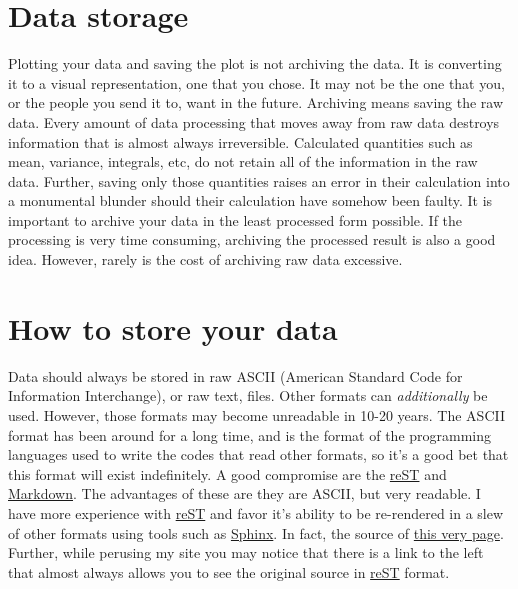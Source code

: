 \documentclass[a4paper]{article}
\begin{document}
\section{Data storage%
  \label{data-storage}%
}

Plotting your data and saving the plot is not archiving the data. It is
converting it to a visual representation, one that you chose. It may not
be the one that you, or the people you send it to, want in the future.
Archiving means saving the raw data. Every amount of data processing
that moves away from raw data destroys information that is almost always
irreversible. Calculated quantities such as mean, variance, integrals,
etc, do not retain all of the information in the raw data. Further,
saving only those quantities raises an error in their calculation into a
monumental blunder should their calculation have somehow been faulty. It
is important to archive your data in the least processed form possible.
If the processing is very time consuming, archiving the processed result
is also a good idea. However, rarely is the cost of archiving raw data
excessive.


\section{How to store your data%
  \label{how-to-store-your-data}%
}

Data should always be stored in raw ASCII (American Standard Code for
Information Interchange), or raw text, files. Other formats can
\emph{additionally} be used. However, those formats may become unreadable in
10-20 years. The ASCII format has been around for a long time, and is
the format of the programming languages used to write the codes that
read other formats, so it's a good bet that this format will exist
indefinitely. A good compromise are the \href{http://docutils.sourceforge.net/rst.html}{reST} and \href{http://daringfireball.net/projects/markdown/}{Markdown}. The advantages of
these are they are ASCII, but very readable. I have more experience
with \href{http://docutils.sourceforge.net/rst.html}{reST} and favor it's ability to
be re-rendered in a slew of other formats using tools such as \href{http://sphinx-doc.org}{Sphinx}. In fact, the source of \href{http://cecs.wright.edu/~jslater/_sources/archivingdata/archivingdata.txt}{this very page}. Further,
while perusing my site you may notice that there is a link to the
left that almost always allows you to see the original source in \href{http://docutils.sourceforge.net/rst.html}{reST}
format.
\end{document}
